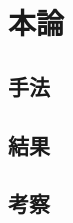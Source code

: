 \documentclass[platex,dvipdfmx]{jsreport}
\begin{document}
\chapter{本論}
\section{手法}
\section{結果}
\section{考察}
\end{document}
